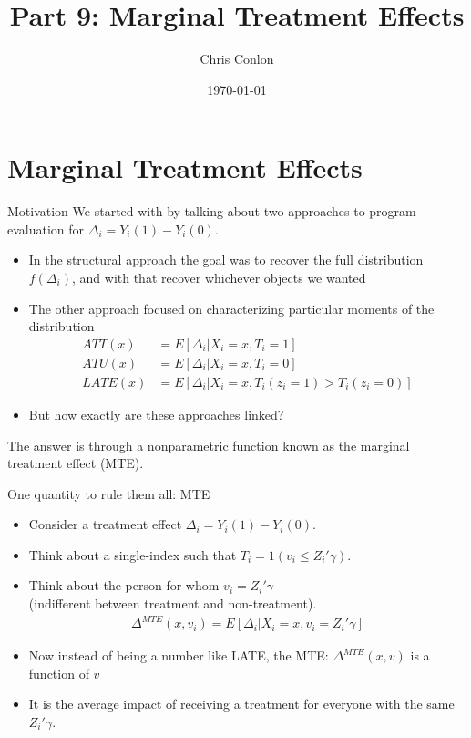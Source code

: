 \documentclass[xcolor=pdftex,dvipsnames,table,mathserif,aspectratio=169]{beamer}
\begin{document}
\title{Part 9: Marginal Treatment Effects}
\author{Chris Conlon}
\date{\today}

\maketitle
\section{Marginal Treatment Effects}


\begin{frame}{Motivation}
We started with by talking about two approaches to program evaluation for $\Delta_i = Y_i(1) - Y_i(0)$.
\begin{itemize}
\item In the \alert{structural approach} the goal was to recover the full distribution $f(\Delta_i)$, and with that recover whichever objects we wanted
\item The other approach focused on characterizing particular moments of the distribution
\begin{align*}
ATT(x) &= E[ \Delta_i | X_i=x, T_{i}=1]\\
ATU(x) &= E[ \Delta_i |  X_i=x,  T_{i}=0]\\
LATE(x) &= E[ \Delta_i |  X_i=x,  T_{i}(z_i=1) > T_{i}(z_i = 0)]
\end{align*}

\item But how exactly are these approaches linked?
\end{itemize}
The answer is through a \alert{nonparametric function} known as the \alert{marginal treatment effect} (MTE).
\end{frame}

\begin{frame}{One quantity to rule them all: MTE}
\begin{itemize}
\item Consider a treatment effect $\Delta_i = Y_{i}(1) - Y_{i}(0)$.
\item Think about a single-index such that $T_i = 1(v_i \leq Z_i' \gamma)$.
\item Think about the person for whom $v_i = Z_i'\gamma$\\
 (indifferent between treatment and non-treatment).
\begin{eqnarray*}
\Delta^{MTE}(x, v_i) = E[\Delta_i | X_i=x, v_i = Z_i'\gamma] 
\end{eqnarray*}
\item Now instead of being \alert{a number} like LATE, the MTE: $\Delta^{MTE}(x, v)$ is a \alert{function} of $v$
\item It is the average impact of receiving a treatment for everyone with the same $Z_i' \gamma$.
\end{itemize}
\end{frame}
\end{document}

